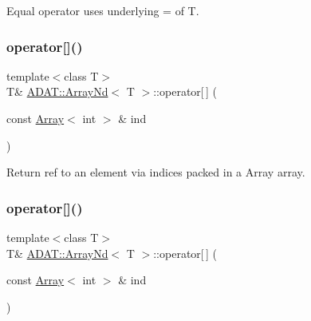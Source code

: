 Equal operator uses underlying = of T. 

\mbox{\label{classADAT_1_1ArrayNd_a5689e9a64be5914877dc3882cc68a283}} 
\subsubsection{\texorpdfstring{operator[]()}{operator[]()}\hspace{0.1cm}{\footnotesize\ttfamily [1/4]}}
{\footnotesize\ttfamily template$<$class T$>$ \\
T\& \mbox{\hyperlink{classADAT_1_1ArrayNd}{A\+D\+A\+T\+::\+Array\+Nd}}$<$ T $>$\+::operator\mbox{[}$\,$\mbox{]} (\begin{DoxyParamCaption}\item[{const \mbox{\hyperlink{classXMLArray_1_1Array}{Array}}$<$ int $>$ \&}]{ind }\end{DoxyParamCaption})\hspace{0.3cm}{\ttfamily [inline]}}



Return ref to an element via indices packed in a Array array. 

\mbox{\label{classADAT_1_1ArrayNd_a5689e9a64be5914877dc3882cc68a283}} 
\subsubsection{\texorpdfstring{operator[]()}{operator[]()}\hspace{0.1cm}{\footnotesize\ttfamily [2/4]}}
{\footnotesize\ttfamily template$<$class T$>$ \\
T\& \mbox{\hyperlink{classADAT_1_1ArrayNd}{A\+D\+A\+T\+::\+Array\+Nd}}$<$ T $>$\+::operator\mbox{[}$\,$\mbox{]} (\begin{DoxyParamCaption}\item[{const \mbox{\hyperlink{classXMLArray_1_1Array}{Array}}$<$ int $>$ \&}]{ind }\end{DoxyParamCaption})\hspace{0.3cm}{\ttfamily [inline]}}



